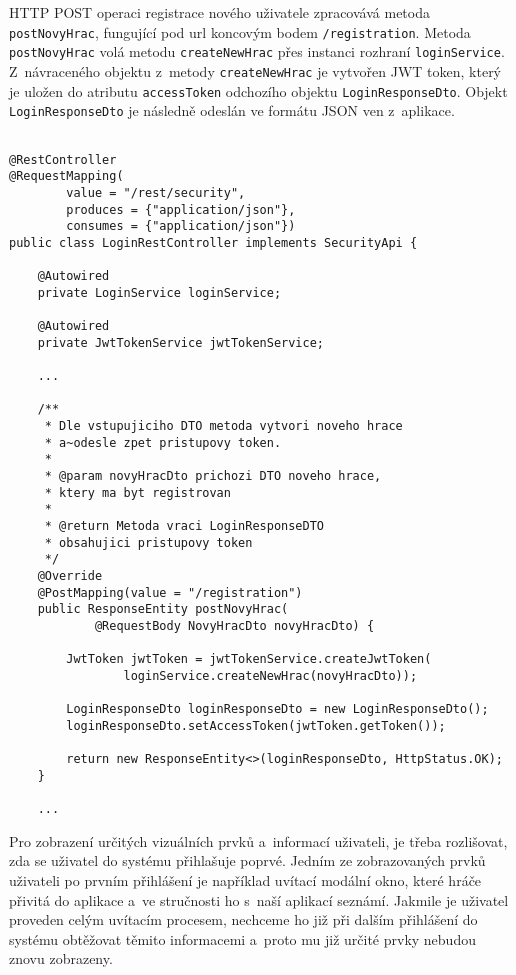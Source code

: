 \documentclass[12pt]{article}
\begin{document}
HTTP POST operaci registrace nového uživatele zpracovává metoda \texttt{postNovyHrac}, fungující pod url koncovým bodem \texttt{/registration}. 
Metoda \texttt{postNovyHrac} volá metodu \texttt{createNewHrac} přes instanci rozhraní \texttt{loginService}. Z~návraceného objektu z~metody \texttt{createNewHrac} je vytvořen JWT token, který je uložen do atributu \texttt{accessToken} odchozího objektu \texttt{LoginResponseDto}. Objekt \texttt{LoginResponseDto} je následně odeslán ve formátu JSON ven z~aplikace.

\clearpage

\begin{lstlisting}

@RestController
@RequestMapping(
        value = "/rest/security",
        produces = {"application/json"},
        consumes = {"application/json"})
public class LoginRestController implements SecurityApi {
    
    @Autowired
    private LoginService loginService;
    
    @Autowired
    private JwtTokenService jwtTokenService;
    
    ...

    /**
     * Dle vstupujiciho DTO metoda vytvori noveho hrace
     * a~odesle zpet pristupovy token.
     *
     * @param novyHracDto prichozi DTO noveho hrace,
     * ktery ma byt registrovan
     *                    
     * @return Metoda vraci LoginResponseDTO
     * obsahujici pristupovy token
     */
    @Override
    @PostMapping(value = "/registration")
    public ResponseEntity postNovyHrac(
            @RequestBody NovyHracDto novyHracDto) {
             
        JwtToken jwtToken = jwtTokenService.createJwtToken(
                loginService.createNewHrac(novyHracDto));
                
        LoginResponseDto loginResponseDto = new LoginResponseDto();
        loginResponseDto.setAccessToken(jwtToken.getToken());

        return new ResponseEntity<>(loginResponseDto, HttpStatus.OK);      
    }
    
    ...

\end{lstlisting}

\clearpage



Pro zobrazení určitých vizuálních prvků a~informací uživateli, je třeba rozlišovat, zda se uživatel do systému přihlašuje poprvé. Jedním ze zobrazovaných prvků uživateli po prvním přihlášení je například uvítací modální okno, které hráče přivitá do aplikace a~ve stručnosti ho s~naší aplikací seznámí. Jakmile je uživatel proveden celým uvítacím procesem, nechceme ho již při dalším přihlášení do systému obtěžovat těmito informacemi a~proto mu již určité prvky nebudou znovu zobrazeny.
\end{document}

